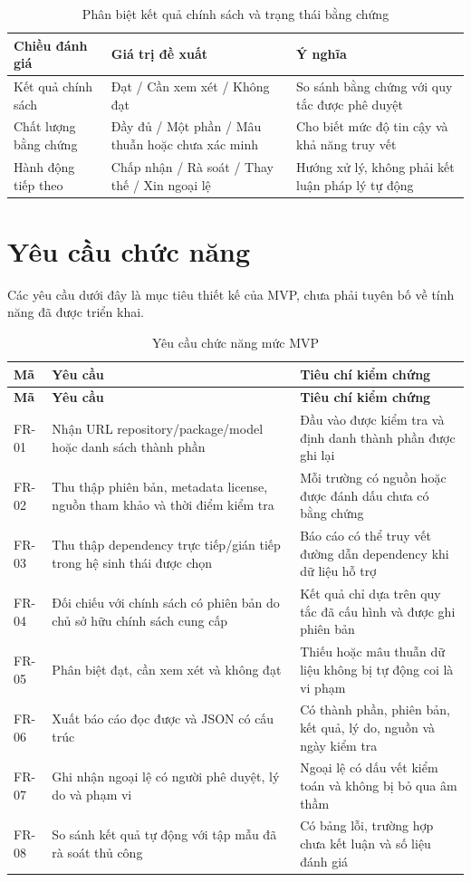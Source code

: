 \begin{table}[H]
\centering
\caption{Phân biệt kết quả chính sách và trạng thái bằng chứng}
\label{tab:evidence-policy}
\begin{tabular}{p{}p{}p{}}
\toprule
\textbf{Chiều đánh giá} & \textbf{Giá trị đề xuất} & \textbf{Ý nghĩa} \\
\midrule
Kết quả chính sách & Đạt / Cần xem xét / Không đạt & So sánh bằng chứng với quy tắc được phê duyệt \\
Chất lượng bằng chứng & Đầy đủ / Một phần / Mâu thuẫn hoặc chưa xác minh & Cho biết mức độ tin cậy và khả năng truy vết \\
Hành động tiếp theo & Chấp nhận / Rà soát / Thay thế / Xin ngoại lệ & Hướng xử lý, không phải kết luận pháp lý tự động \\
\bottomrule
\end{tabular}
\end{table}

\section{Yêu cầu chức năng}
Các yêu cầu dưới đây là mục tiêu thiết kế của MVP, chưa phải tuyên bố về tính năng đã được triển khai.

\begin{longtable}{p{}p{}p{}}
\caption{Yêu cầu chức năng mức MVP}\label{tab:fr}\\
\toprule
\textbf{Mã} & \textbf{Yêu cầu} & \textbf{Tiêu chí kiểm chứng} \\
\midrule
\endfirsthead
\toprule
\textbf{Mã} & \textbf{Yêu cầu} & \textbf{Tiêu chí kiểm chứng} \\
\midrule
\endhead
FR-01 & Nhận URL repository/package/model hoặc danh sách thành phần & Đầu vào được kiểm tra và định danh thành phần được ghi lại \\
FR-02 & Thu thập phiên bản, metadata license, nguồn tham khảo và thời điểm kiểm tra & Mỗi trường có nguồn hoặc được đánh dấu chưa có bằng chứng \\
FR-03 & Thu thập dependency trực tiếp/gián tiếp trong hệ sinh thái được chọn & Báo cáo có thể truy vết đường dẫn dependency khi dữ liệu hỗ trợ \\
FR-04 & Đối chiếu với chính sách có phiên bản do chủ sở hữu chính sách cung cấp & Kết quả chỉ dựa trên quy tắc đã cấu hình và được ghi phiên bản \\
FR-05 & Phân biệt đạt, cần xem xét và không đạt & Thiếu hoặc mâu thuẫn dữ liệu không bị tự động coi là vi phạm \\
FR-06 & Xuất báo cáo đọc được và JSON có cấu trúc & Có thành phần, phiên bản, kết quả, lý do, nguồn và ngày kiểm tra \\
FR-07 & Ghi nhận ngoại lệ có người phê duyệt, lý do và phạm vi & Ngoại lệ có dấu vết kiểm toán và không bị bỏ qua âm thầm \\
FR-08 & So sánh kết quả tự động với tập mẫu đã rà soát thủ công & Có bảng lỗi, trường hợp chưa kết luận và số liệu đánh giá \\
\bottomrule
\end{longtable}

